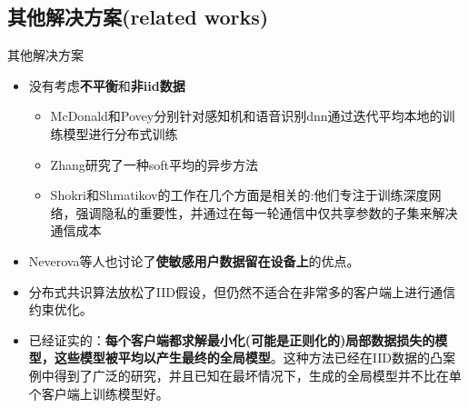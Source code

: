 \documentclass{beamer}
\begin{document}
\subsection{其他解决方案(related works)}
\begin{frame}{\songti 其他解决方案}
    \begin{itemize}
        \item 没有考虑\textbf{不平衡}和\textbf{非iid数据}
            \begin{itemize}
                \item McDonald和Povey分别针对感知机和语音识别dnn通过迭代平均本地的训练模型进行分布式训练
                \item Zhang研究了一种soft平均的异步方法
                \item Shokri和Shmatikov的工作在几个方面是相关的:他们专注于训练深度网络，强调隐私的重要性，并通过在每一轮通信中仅共享参数的子集来解决通信成本
            \end{itemize}
        \item Neverova等人也讨论了\textbf{使敏感用户数据留在设备上}的优点。
        \item 分布式共识算法放松了IID假设，但仍然不适合在非常多的客户端上进行通信约束优化。
        \item 已经证实的：\textbf{每个客户端都求解最小化(可能是正则化的)局部数据损失的模型，这些模型被平均以产生最终的全局模型}。这种方法已经在IID数据的凸案例中得到了广泛的研究，并且已知在最坏情况下，生成的全局模型并不比在单个客户端上训练模型好。
    \end{itemize}
\end{frame}
\end{document}
